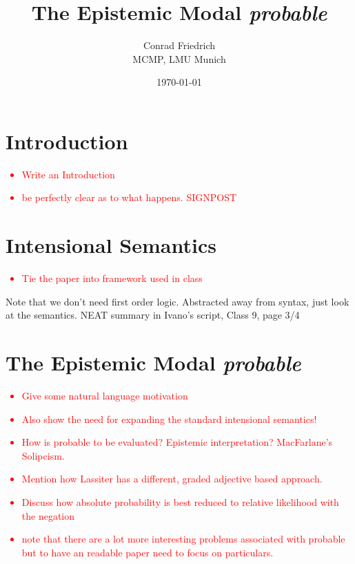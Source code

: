 \documentclass{article}
\title{The Epistemic Modal \emph{probable}}
\author{Conrad Friedrich \\ MCMP, LMU Munich }
\date{\today}
\theoremstyle{definition}
\newcommand\todo[1]{\textcolor{red}{#1}}
\begin{document}
\onehalfspacing

\maketitle

\tableofcontents
\section{Introduction}

\todo{
  \begin{itemize}[nosep]
    \item Write an Introduction
     \item be perfectly clear as to what happens. SIGNPOST 
  \end{itemize}
}
\section{Intensional Semantics}
\todo{ \begin{itemize}[nosep]
  \item Tie the paper into framework used in class
\end{itemize} }

Note that we don't need first order logic. 
Abstracted away from syntax, just look at the semantics.
NEAT summary in Ivano's script, Class 9, page 3/4
\section{The Epistemic Modal \emph{probable}}
\todo{\begin{itemize}[nosep]
    \item  Give some natural language motivation
    \item Also show the need for expanding the standard intensional semantics!
    \item How is probable to be evaluated? Epistemic interpretation? MacFarlane's Solipcism.
    \item Mention how Lassiter has a different, graded adjective based approach.
    \item Discuss how absolute probability is best reduced to relative likelihood with the negation
      \item note that there are a lot more interesting problems associated with probable but to have an readable paper need to focus on particulars.
  \end{itemize}
}
\end{document}

